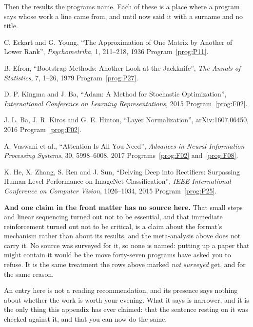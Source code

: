 \medskip
Then the results the programs name. Each of these is a place where a program
says whose work a line came from, and until now said it with a surname and no
title.

\begin{reslist}
\item C. Eckart and G. Young, \enquote{The Approximation of One Matrix by
  Another of Lower Rank}, \emph{Psychometrika}, 1, 211--218, 1936 \dash{}
  Program~\ref{prog:P11}.
\item B. Efron, \enquote{Bootstrap Methods: Another Look at the Jackknife},
  \emph{The Annals of Statistics}, 7, 1--26, 1979 \dash{}
  Program~\ref{prog:P27}.
\item D. P. Kingma and J. Ba, \enquote{Adam: A Method for Stochastic
  Optimization}, \emph{International Conference on Learning Representations},
  2015 \dash{} Program~\ref{prog:F02}.
\item J. L. Ba, J. R. Kiros and G. E. Hinton, \enquote{Layer Normalization},
  arXiv:1607.06450, 2016 \dash{} Program~\ref{prog:F02}.
\item A. Vaswani et al., \enquote{Attention Is All You Need}, \emph{Advances
  in Neural Information Processing Systems}, 30, 5998--6008, 2017 \dash{}
  Programs~\ref{prog:F02} and~\ref{prog:F08}.
\item K. He, X. Zhang, S. Ren and J. Sun, \enquote{Delving Deep into
  Rectifiers: Surpassing Human-Level Performance on ImageNet Classification},
  \emph{IEEE International Conference on Computer Vision}, 1026--1034, 2015
  \dash{} Program~\ref{prog:P25}.
\end{reslist}

\medskip
\textbf{And one claim in the front matter has no source here.} That small steps
and linear sequencing turned out not to be essential, and that immediate
reinforcement turned out not to be critical, is a claim about the format's
mechanism rather than about its results, and the meta-analysis above does not
carry it. No source was surveyed for it, so none is named: putting up a paper
that might contain it would be the move forty-seven programs have asked you to
refuse. It is the same treatment the rows above marked \emph{not surveyed} get,
and for the same reason.

\medskip
An entry here is not a reading recommendation, and its presence says nothing
about whether the work is worth your evening. What it says is narrower, and it
is the only thing this appendix has ever claimed: that the sentence resting on
it was checked against it, and that you can now do the same.
